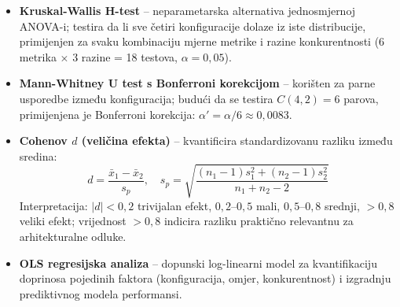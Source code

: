 \begin{itemize}[noitemsep, topsep=4pt]
  \item \textbf{Kruskal-Wallis H-test} -- neparametarska alternativa jednosmjernoj ANOVA-i; testira da li sve četiri konfiguracije dolaze iz iste distribucije, primijenjen za svaku kombinaciju mjerne metrike i razine konkurentnosti (6 metrika $\times$ 3 razine = 18 testova, $\alpha = 0,05$).

  \item \textbf{Mann-Whitney U test s Bonferroni korekcijom} -- korišten za parne usporedbe između konfiguracija; budući da se testira $C(4,2) = 6$ parova, primijenjena je Bonferroni korekcija: $\alpha' = \alpha/6 \approx 0,0083$.

  \item \textbf{Cohenov $d$ (veličina efekta)} -- kvantificira standardizovanu razliku između sredina:
  \begin{equation}
  d = \frac{\bar{x}_1 - \bar{x}_2}{s_p}, \quad
  s_p = \sqrt{\frac{(n_1-1)s_1^2 + (n_2-1)s_2^2}{n_1 + n_2 - 2}}
  \label{eq:cohen_d}
  \end{equation}
  Interpretacija: $|d| < 0,2$ trivijalan efekt, $0,2$--$0,5$ mali, $0,5$--$0,8$ srednji, $> 0,8$ veliki efekt; vrijednost $> 0,8$ indicira razliku praktično relevantnu za arhitekturalne odluke.

  \item \textbf{OLS regresijska analiza} -- dopunski log-linearni model za kvantifikaciju doprinosa pojedinih faktora (konfiguracija, omjer, konkurentnost) i izgradnju prediktivnog modela performansi.
\end{itemize}
